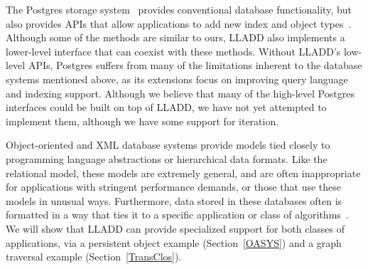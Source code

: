 \documentclass[10pt,letterpaper,twocolumn,english]{article}
\newcommand{\yad}{LLADD\xspace}
\begin{document}
The Postgres storage system~\cite{postgres} provides conventional
database functionality, but also provides APIs that allow applications to 
add new index and object types~\cite{newTypes}.  Although some of the methods are
similar to ours, \yad also implements a lower-level
interface that can coexist with these methods.  Without \yad's
low-level APIs, Postgres suffers from many of the limitations inherent
to the database systems mentioned above, as its extensions focus on
improving
query language and indexing support.
Although we
believe that many of the high-level Postgres interfaces could be built
on top of \yad, we have not yet attempted to implement them, although
we have some support for iteration.

Object-oriented and XML database systems provide models tied closely
to programming language abstractions or hierarchical data formats.
Like the relational model, these models are extremely general, and are
often inappropriate for applications with stringent performance
demands, or those that use  these models in unusual ways.  Furthermore, data stored in these databases
often is formatted in a way that ties it to a specific application or
class of algorithms~\cite{lamb}.  We will show that \yad can provide 
specialized support for both classes of applications, via a persistent 
object example (Section~\ref{OASYS}) and a graph traversal example 
(Section~\ref{TransClos}).

\end{document}
